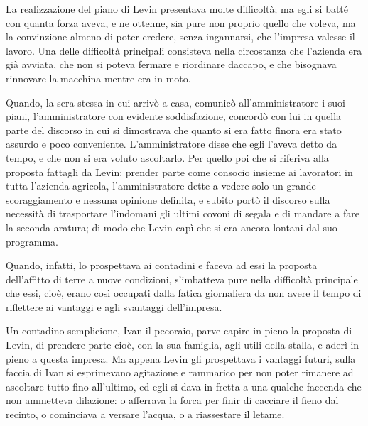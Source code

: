 La realizzazione del piano di Levin presentava molte difficoltà; ma egli si batté con quanta forza aveva, e ne ottenne, sia pure non proprio quello che voleva, ma la convinzione almeno di poter credere, senza ingannarsi, che l'impresa valesse il lavoro. Una delle difficoltà principali consisteva nella circostanza che l'azienda era già avviata, che non si poteva fermare e riordinare daccapo, e che bisognava rinnovare la macchina mentre era in moto. 

Quando, la sera stessa in cui arrivò a casa, comunicò all'amministratore i suoi piani, l'amministratore con evidente soddisfazione, concordò con lui in quella parte del discorso in cui si dimostrava che quanto si era fatto finora era stato assurdo e poco conveniente. L'amministratore disse che egli l'aveva detto da tempo, e che non si era voluto ascoltarlo. Per quello poi che si riferiva alla proposta fattagli da Levin: prender parte come consocio insieme ai lavoratori in tutta l'azienda agricola, l'amministratore dette a vedere solo un grande scoraggiamento e nessuna opinione definita, e subito portò il discorso sulla necessità di trasportare l'indomani gli ultimi covoni di segala e di mandare a fare la seconda aratura; di modo che Levin capì che si era ancora lontani dal suo programma. 

Quando, infatti, lo prospettava ai contadini e faceva ad essi la proposta dell'affitto di terre a nuove condizioni, s'imbatteva pure nella difficoltà principale che essi, cioè, erano così occupati dalla fatica giornaliera da non avere il tempo di riflettere ai vantaggi e agli svantaggi dell'impresa. 

Un contadino semplicione, Ivan il pecoraio, parve capire in pieno la proposta di Levin, di prendere parte cioè, con la sua famiglia, agli utili della stalla, e aderì in pieno a questa impresa. Ma appena Levin gli prospettava i vantaggi futuri, sulla faccia di Ivan si esprimevano agitazione e rammarico per non poter rimanere ad ascoltare tutto fino all'ultimo, ed egli si dava in fretta a una qualche faccenda che non ammetteva dilazione: o afferrava la forca per finir di cacciare il fieno dal recinto, o cominciava a versare l'acqua, o a riassestare il letame. 

